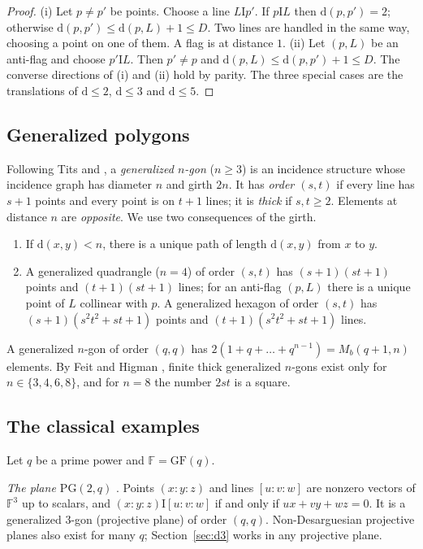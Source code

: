 \documentclass[11pt]{amsart}
\theoremstyle{definition}
\theoremstyle{remark}
\newcommand{\I}{\mathrel{\mathrm{I}}}
\newcommand{\PG}{\mathrm{PG}}
\newcommand{\GF}{\mathrm{GF}}
\newcommand{\F}{\mathbb{F}}
\newcommand{\dd}{\mathrm{d}}
\newcommand{\pnt}[3]{({#1}{:}{#2}{:}{#3})}
\newcommand{\lin}[3]{[{#1}{:}{#2}{:}{#3}]}
\begin{document}
\begin{proof}
(i) Let $p\ne p'$ be points. Choose a line $L\I p'$. If $p\I L$ then $\dd(p,p')=2$; otherwise $\dd(p,p')\le\dd(p,L)+1\le D$. Two lines are handled in the same way, choosing a point on one of them. A flag is at distance $1$. (ii) Let $(p,L)$ be an anti-flag and choose $p'\I L$. Then $p'\ne p$ and $\dd(p,L)\le\dd(p,p')+1\le D$. The converse directions of (i) and (ii) hold by parity. The three special cases are the translations of $\dd\le2$, $\dd\le3$ and $\dd\le5$.
\end{proof}

\subsection{Generalized polygons}
Following Tits and \cite{VM98}, a \emph{generalized $n$-gon} ($n\ge3$) is an incidence structure whose incidence graph has diameter $n$ and girth $2n$. It has \emph{order $(s,t)$} if every line has $s+1$ points and every point is on $t+1$ lines; it is \emph{thick} if $s,t\ge2$. Elements at distance $n$ are \emph{opposite}. We use two consequences of the girth.
\begin{enumerate}[label=\textup{(G\arabic*)},leftmargin=3em]
\item\label{g:unique} If $\dd(x,y)<n$, there is a unique path of length $\dd(x,y)$ from $x$ to $y$.
\item\label{g:count} A generalized quadrangle ($n=4$) of order $(s,t)$ has $(s+1)(st+1)$ points and $(t+1)(st+1)$ lines; for an anti-flag $(p,L)$ there is a unique point of $L$ collinear with $p$. A generalized hexagon of order $(s,t)$ has $(s+1)(s^2t^2+st+1)$ points and $(t+1)(s^2t^2+st+1)$ lines.
\end{enumerate}
A generalized $n$-gon of order $(q,q)$ has $2(1+q+\dots+q^{n-1})=M_b(q+1,n)$ elements. By Feit and Higman \cite{FH64}, finite thick generalized $n$-gons exist only for $n\in\{3,4,6,8\}$, and for $n=8$ the number $2st$ is a square.

\subsection{The classical examples}
Let $q$ be a prime power and $\F=\GF(q)$.

\emph{The plane $\PG(2,q)$} \cite{H98}. Points $\pnt xyz$ and lines $\lin uvw$ are nonzero vectors of $\F^3$ up to scalars, and $\pnt xyz\I\lin uvw$ if and only if $ux+vy+wz=0$. It is a generalized $3$-gon (projective plane) of order $(q,q)$. Non-Desarguesian projective planes also exist for many $q$; Section~\ref{sec:d3} works in any projective plane.
\end{document}
